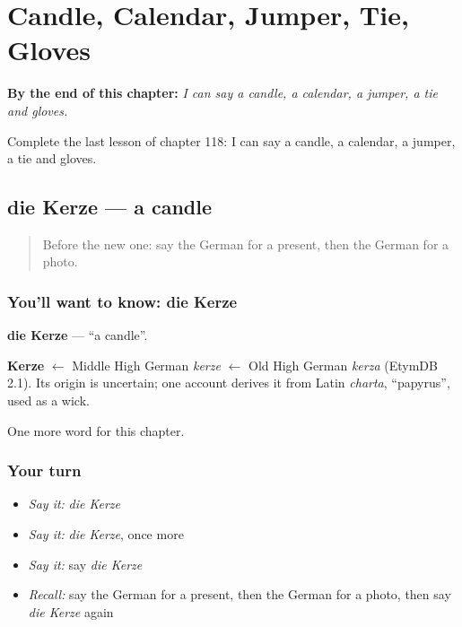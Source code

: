 
\chapter{Candle, Calendar, Jumper, Tie, Gloves}
\label{ch:ge-candle-calendar-jumper-tie-gloves}

\begin{chapteropening}
\textbf{By the end of this chapter:} \emph{I can say a candle, a calendar, a jumper, a tie and gloves.}

Complete the last lesson of chapter 118: I can say a candle, a calendar, a jumper, a tie and gloves.
\end{chapteropening}

\section[die Kerze]{die Kerze — a candle}

\label{lesson:GE-C118-kerze}



\begin{quote}
Before the new one: say the German for a present, then the German for a photo.
\end{quote}

\subsection*{You'll want to know: die Kerze}
\textbf{die Kerze} — \textquotedblleft{}a candle\textquotedblright{}.

\begin{cousinweb}
\textbf{Kerze} $\leftarrow$ Middle High German \emph{kerze} $\leftarrow$ Old High German \emph{kerza} (EtymDB 2.1). Its origin is uncertain; one account derives it from Latin \emph{charta}, \textquotedblleft{}papyrus\textquotedblright{}, used as a wick.
\end{cousinweb}

\begin{grammarlens}[title={What you've built}]
One more word for this chapter.
\end{grammarlens}

\subsection*{Your turn}
\begin{itemize}
\raggedright
  \item \emph{Say it:} \emph{die Kerze}
  \item \emph{Say it:} \emph{die Kerze}, once more
  \item \emph{Say it:} say \emph{die Kerze}
  \item \emph{Recall:} say the German for a present, then the German for a photo, then say \emph{die Kerze} again
\end{itemize}

